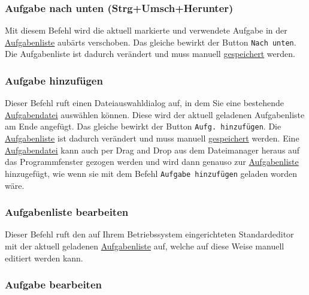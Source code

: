 \documentclass[a4paper,DIV=11
]{scrartcl}
\begin{document}
\hypertarget{aufgabe-nach-unten-strgumschherunter}{%
\subsubsection{Aufgabe nach unten
(Strg+Umsch+Herunter)}\label{aufgabe-nach-unten-strgumschherunter}}

Mit diesem Befehl wird die aktuell markierte und verwendete Aufgabe in
der \protect\hyperlink{aufgabenlisten}{Aufgabenliste} aubärts
verschoben. Das gleiche bewirkt der Button \texttt{Nach\ unten}. Die
Aufgabenliste ist dadurch verändert und muss manuell
\protect\hyperlink{AufgabenlisteSpeichern}{gespeichert} werden.

\hypertarget{aufgabe-hinzufuxfcgen}{%
\subsubsection{Aufgabe hinzufügen}\label{aufgabe-hinzufuxfcgen}}

Dieser Befehl ruft einen Dateiauswahldialog auf, in dem Sie eine
bestehende \protect\hyperlink{Aufgabendatei}{Aufgabendatei} auswählen
können. Diese wird der aktuell geladenen Aufgabenliste am Ende angefügt.
Das gleiche bewirkt der Button \texttt{Aufg.\ hinzufügen}. Die
\protect\hyperlink{Aufgabenliste}{Aufgabenliste} ist dadurch verändert
und muss manuell \protect\hyperlink{AufgabenlisteSpeichern}{gespeichert}
werden. Eine \protect\hyperlink{Aufgabendatei}{Aufgabendatei} kann auch per Drag
and Drop aus dem Dateimanager heraus auf das Programmfenster gezogen
werden und wird dann genauso zur
\protect\hyperlink{Aufgabenliste}{Aufgabenliste} hinzugefügt, wie wenn
sie mit dem Befehl \texttt{Aufgabe\ hinzufügen} geladen worden wäre.

\hypertarget{aufgabenliste-bearbeiten}{%
\subsubsection{Aufgabenliste
bearbeiten}\label{aufgabenliste-bearbeiten}}

Dieser Befehl ruft den auf Ihrem Betriebssystem eingerichteten
Standardeditor mit der aktuell geladenen
\protect\hyperlink{aufgabenlisten}{Aufgabenliste} auf, welche auf diese
Weise manuell editiert werden kann.

\hypertarget{aufgabe-bearbeiten}{%
\subsubsection{Aufgabe bearbeiten}\label{aufgabe-bearbeiten}}
\end{document}
